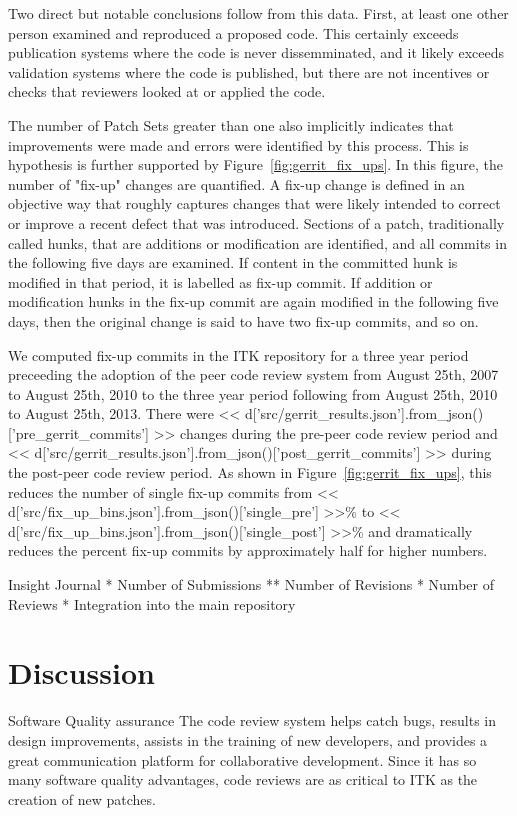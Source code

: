 \documentclass{frontiersENG} %
\begin{document}
\begin{enumeruate}
Two direct but notable conclusions follow from this data. First, at least one
other person examined and reproduced a proposed code.  This certainly exceeds
publication systems where the code is never dissemminated, and it likely
exceeds validation systems where the code is published, but there are not
incentives or checks that reviewers looked at or applied the code.

The number of Patch Sets greater than one also implicitly indicates that
improvements were made and errors were identified by this process.  This is
hypothesis is further supported by Figure~\ref{fig:gerrit_fix_ups}.  In this
figure, the number of "fix-up" changes are quantified. A fix-up change is
defined in an objective way that roughly captures changes that were likely
intended to correct or improve a recent defect that was introduced.  Sections
of a patch, traditionally called hunks, that are additions or modification are
identified, and all commits in the following five days are examined.  If
content in the committed hunk is modified in that period, it is labelled as
fix-up commit.  If addition or modification hunks in the fix-up commit are again
modified in the following five days, then the original change is said to have
two fix-up commits, and so on.

We computed fix-up commits in the ITK repository for a three year period
preceeding the adoption of the peer code review system from August 25th, 2007
to August 25th, 2010 to the three year period following from August 25th, 2010
to August 25th, 2013.  There were
<< d['src/gerrit_results.json'].from_json()['pre_gerrit_commits'] >>
changes during the pre-peer code review period and
<< d['src/gerrit_results.json'].from_json()['post_gerrit_commits'] >>
during the post-peer code review period.  As shown in
Figure~\ref{fig:gerrit_fix_ups}, this reduces the number of
single fix-up commits from <<
d['src/fix_up_bins.json'].from_json()['single_pre'] >>\%
to << d['src/fix_up_bins.json'].from_json()['single_post'] >>\% and
dramatically reduces the percent fix-up commits by approximately half for
higher numbers.

Insight Journal
* Number of Submissions
** Number of Revisions
* Number of Reviews
* Integration into the main repository


\section{Discussion}
Software Quality assurance
The code review system helps catch bugs, results in design improvements, assists in the training of new developers, and provides a great communication platform for collaborative development. Since it has so many software quality advantages, code reviews are as critical to ITK as the creation of new patches.



\end{enumeruate}
\end{document}
